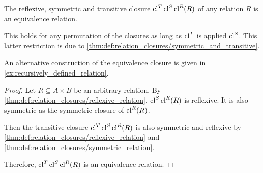 \begin{proposition}\label{thm:equivalence_closure}
  The \hyperref[def:relation_closures/reflexive]{reflexive}, \hyperref[def:relation_closures/symmetric]{symmetric} and \hyperref[def:relation_closures/transitive]{transitive} closure \( \operatorname{cl}^T \operatorname{cl}^S \operatorname{cl}^R (R) \) of any relation \( R \) is an \hyperref[def:equivalence_relation]{equivalence relation}.
\end{proposition}
\begin{comments}
  \item This holds for any permutation of the closures as long as \( \operatorname{cl}^T \) is applied  \( \operatorname{cl}^S \). This latter restriction is due to \cref{thm:def:relation_closures/symmetric_and_transitive}.
  \item An alternative construction of the equivalence closure is given in \cref{ex:recursively_defined_relation}.
\end{comments}
\begin{proof}
  Let \( R \subseteq A \times B \) be an arbitrary relation. By \cref{thm:def:relation_closures/reflexive_relation}, \( \operatorname{cl}^S \operatorname{cl}^R (R) \) is reflexive. It is also symmetric as the symmetric closure of \( \operatorname{cl}^R(R) \).

  Then the transitive closure \( \operatorname{cl}^T \operatorname{cl}^S \operatorname{cl}^R (R) \) is also symmetric and reflexive by \cref{thm:def:relation_closures/reflexive_relation} and \cref{thm:def:relation_closures/symmetric_relation}.

  Therefore, \( \operatorname{cl}^T \operatorname{cl}^S \operatorname{cl}^R (R) \) is an equivalence relation.
\end{proof}
